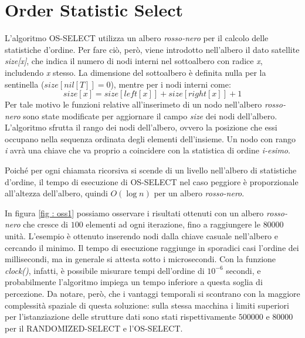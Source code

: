 \documentclass[12pt, a4paper]{article}
\begin{document}
\section{Order Statistic Select}
	\label{sec : oss}
	L'algoritmo \textrm{OS-SELECT} utilizza un albero \emph{rosso-nero} per il calcolo delle statistiche d'ordine. Per fare ciò, però, viene introdotto nell'albero il dato satellite \emph{size[x]}, che indica il numero di nodi interni nel sottoalbero con radice \emph{x}, includendo \emph{x} stesso. La dimensione del sottoalbero è definita nulla per la sentinella ($size[nil[T]]=0$), mentre per i nodi interni come:
	\begin{equation*}
		size[x]=size[left[x]]+size[right[x]]+1
	\end{equation*}
	Per tale motivo le funzioni relative all'inserimeto di un nodo nell'albero \emph{rosso-nero} sono state modificate per aggiornare il campo \emph{size} dei nodi dell'albero.
	L'algoritmo sfrutta il rango dei nodi dell'albero, ovvero la posizione che essi occupano nella sequenza ordinata degli elementi dell'insieme. Un nodo con rango \emph{i} avrà una chiave che va proprio a coincidere con la statistica di ordine \emph{i-esimo}.
	
	Poiché per ogni chiamata ricorsiva si scende di un livello nell'albero di statistiche d'ordine, il tempo di esecuzione di \textrm{OS-SELECT} nel caso peggiore è proporzionale all'altezza dell'albero, quindi $O(\log{n})$ per un albero \emph{rosso-nero}.\par
	In figura \ref{fig : oss1} possiamo osservare i risultati ottenuti con un albero \emph{rosso-nero} che cresce di $100$ elementi ad ogni iterazione, fino a raggiungere le $80000$ unità. L'esempio è ottenuto inserendo nodi dalla chiave casuale nell'albero e cercando il minimo. Il tempo di esecuzione raggiunge in sporadici casi l'ordine dei millisecondi, ma in generale si attesta sotto i microsecondi. Con la funzione \emph{clock()}, infatti, è possibile misurare tempi dell'ordine di $10^{-6}$ secondi, e probabilmente l'algoritmo impiega un tempo inferiore a questa soglia di percezione. Da notare, però, che i vantaggi temporali si scontrano con la maggiore complessità spaziale di questa soluzione: sulla stessa macchina i limiti superiori per l'istanziazione delle strutture dati sono stati rispettivamente $500000$ e $80000$ per il \textrm{RANDOMIZED-SELECT} e l'\textrm{OS-SELECT}.
\end{document}
